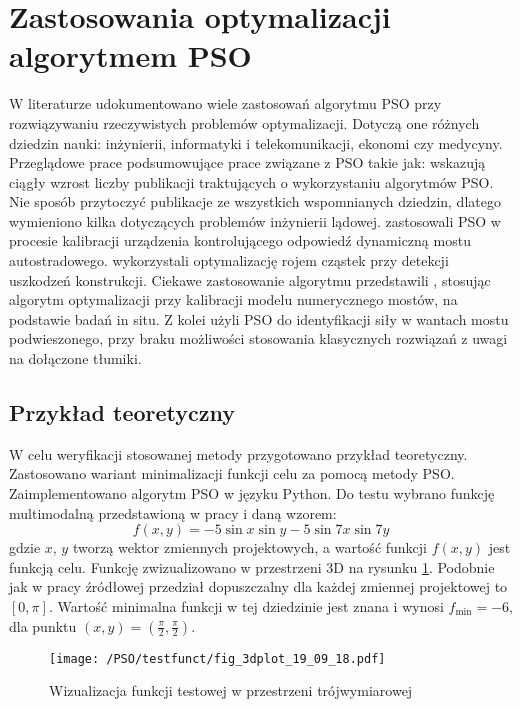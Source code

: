 \section{Zastosowania optymalizacji algorytmem PSO}
W literaturze udokumentowano wiele zastosowań algorytmu PSO przy rozwiązywaniu rzeczywistych problemów optymalizacji. Dotyczą one różnych dziedzin nauki: inżynierii, informatyki i telekomunikacji, ekonomi czy medycyny. Przeglądowe prace podsumowujące prace związane z PSO takie jak: \cite{Atyabi2011,CoelloCoello2006,Lalwani2013} wskazują ciągły wzrost liczby publikacji traktujących o wykorzystaniu algorytmów PSO. Nie sposób przytoczyć publikacje ze wszystkich wspomnianych dziedzin, dlatego wymieniono kilka dotyczących problemów inżynierii lądowej. \cite{Hughes2018} zastosowali PSO w procesie kalibracji urządzenia kontrolującego odpowiedź dynamiczną mostu autostradowego. \cite{Seyedpoor2011,Kang2012,Wei2018} wykorzystali optymalizację rojem cząstek przy detekcji uszkodzeń konstrukcji. Ciekawe zastosowanie algorytmu przedstawili \cite{Tran-Ngoc2018,Qin2018}, stosując algorytm optymalizacji przy kalibracji modelu numerycznego mostów, na podstawie badań in situ. Z kolei \cite{Dan2015} użyli PSO do identyfikacji siły w wantach mostu podwieszonego, przy braku możliwości stosowania klasycznych rozwiązań z uwagi na dołączone tłumiki.

\subsection{Przykład teoretyczny} \label{sect: pso_single_teor_exampl}
W celu weryfikacji stosowanej metody przygotowano przykład teoretyczny. Zastosowano wariant minimalizacji funkcji celu za pomocą metody PSO. Zaimplementowano algorytm PSO w języku Python. Do testu wybrano funkcję multimodalną przedstawioną w pracy \parencite{Tesch2016} i daną wzorem:
\begin{equation} \label{eq: pso_test_func}
	f(x,y) = -5\sin{x}\sin{y}-5\sin{7x}\sin{7y}
\end{equation}
gdzie $x$, $y$ tworzą wektor zmiennych projektowych, a wartość funkcji $f(x,y)$ jest funkcją celu. Funkcję zwizualizowano w przestrzeni 3D na rysunku \ref{fig: pso_example_function}. Podobnie jak w pracy źródłowej przedział dopuszczalny dla każdej zmiennej projektowej to $[0,\pi]$. Wartość minimalna funkcji w tej dziedzinie jest znana i wynosi $f_{\text{min}}=-6$, dla punktu $(x,y)=(\frac{\pi}{2},\frac{\pi}{2})$.
\begin{figure}[h]
	\centering
	\texttt{[image: /PSO/testfunct/fig\_3dplot\_19\_09\_18.pdf]} 
	\captionsetup{justification=centering}
	\caption{Wizualizacja funkcji testowej w przestrzeni trójwymiarowej}
	\label{fig: pso_example_function}
\end{figure}

